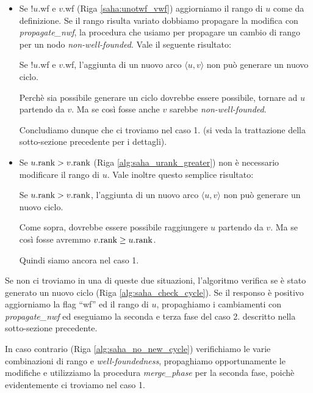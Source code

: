 \begin{itemize}
    \item Se !$u$.wf e $v$.wf (Riga \ref{saha:unotwf_vwf}) aggiorniamo il rango di $u$ come da definizione. Se il rango risulta variato dobbiamo propagare la modifica con \emph{propagate\_nwf}, la procedura che usiamo per propagare un cambio di rango per un nodo \emph{non-well-founded}. Vale il seguente risultato:
    \begin{observation}
        Se !$u$.wf e $v$.wf, l'aggiunta di un nuovo arco $\langle u,v \rangle$ non può generare un nuovo ciclo.
    \end{observation}
    \begin{proof2}
        Perchè sia possibile generare un ciclo dovrebbe essere possibile, tornare ad $u$ partendo da $v$. Ma se così fosse anche $v$ sarebbe \emph{non-well-founded}.
    \end{proof2}
    Concludiamo dunque che ci troviamo nel caso 1. (si veda la trattazione della sotto-sezione precedente per i dettagli).
    \item Se $u.\textup{rank} > v.\textup{rank}$ (Riga \ref{alg:saha_urank_greater}) non è necessario modificare il rango di $u$. Vale inoltre questo semplice risultato:
    \begin{observation}
        Se $u.\textup{rank} > v.\textup{rank}$, l'aggiunta di un nuovo arco $\langle u,v \rangle$ non può generare un nuovo ciclo.
    \end{observation}
    \begin{proof2}
        Come sopra, dovrebbe essere possibile raggiungere $u$ partendo da $v$. Ma se così fosse avremmo $v.\textup{rank} \geq u.\textup{rank}$.
    \end{proof2}
    Quindi siamo ancora nel caso 1.
\end{itemize}
Se non ci troviamo in una di queste due situazioni, l'algoritmo verifica se è stato generato un nuovo ciclo (Riga \ref{alg:saha_check_cycle}). Se il responso è positivo aggiorniamo la flag ``wf'' ed il rango di $u$, propaghiamo i cambiamenti con \emph{propagate\_nwf} ed eseguiamo la seconda e terza fase del caso 2. descritto nella sotto-sezione precedente.

In caso contrario (Riga \ref{alg:saha_no_new_cycle}) verifichiamo le varie combinazioni di rango e \emph{well-foundedness}, propaghiamo opportunamente le modifiche e utilizziamo la procedura \emph{merge\_phase} per la seconda fase, poichè evidentemente ci troviamo nel caso 1.

